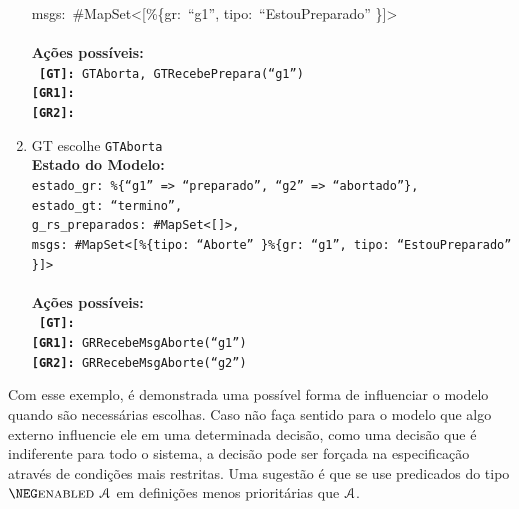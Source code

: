 \begin{enumerate}
{    msgs:\ \#MapSet\textless{}[\%\{gr:\ ``g1'', tipo:\ ``EstouPreparado'' \}]\textgreater{}\\\\}
  \textbf{Ações possíveis:}\\\texttt{
    \textbf{[GT]:}\ GTAborta, GTRecebePrepara(``g1'')\\
    \textbf{[GR1]:}\ \\
    \textbf{[GR2]:}\ \\}
\item GT escolhe \texttt{GTAborta}\\
  \textbf{Estado do Modelo:} \texttt{\small \\
    estado\_gr:\ \%\{``g1'' =\textgreater{} ``preparado'', ``g2'' =\textgreater{}
    ``abortado''\},\\
    estado\_gt:\ ``termino'',\\
    g\_rs\_preparados:\ \#MapSet\textless{}[]\textgreater{},\\
    msgs:\ \#MapSet\textless{}[\%\{tipo:\ ``Aborte'' \}\%\{gr:\ ``g1'', tipo:\
    ``EstouPreparado'' \}]\textgreater{}\\\\}
  \textbf{Ações possíveis:}\\\texttt{
    \textbf{[GT]:}\\
    \textbf{[GR1]:}\ GRRecebeMsgAborte(``g1'')\\
    \textbf{[GR2]:}\ GRRecebeMsgAborte(``g2'')}
\end{enumerate}

Com esse exemplo, é demonstrada uma possível forma de influenciar o modelo
quando são necessárias escolhas. Caso não faça sentido para o modelo que algo
externo influencie ele em uma determinada decisão, como uma decisão que é
indiferente para todo o sistema, a decisão pode ser forçada na especificação
através de condições mais restritas. Uma sugestão é que se use predicados do
tipo $\NEG\ENABLED\FANCYA$ em definições menos prioritárias que $\textbf{$\mathcal{A}$}$.
